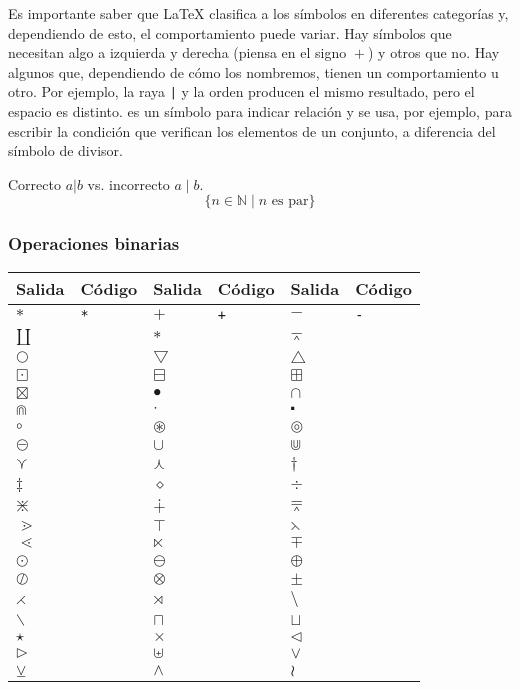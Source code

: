 \documentclass{article}
\numberwithin{equation}{section}
\theoremstyle{plain}
\theoremstyle{definition}
\theoremstyle{remark}
\def\X#1{$#1$ & \texttt{#1}} %
\begin{document}
Es importante saber que \LaTeX{} clasifica a los símbolos en diferentes categorías y, dependiendo de esto, el comportamiento puede variar. Hay símbolos que necesitan algo a izquierda y derecha (piensa en el signo ${}+{}$) y otros que no. Hay algunos que, dependiendo de cómo los nombremos, tienen un comportamiento u otro. Por ejemplo, la raya \texttt{|} y la orden \texttt{\pmid} producen el mismo resultado, pero el espacio es distinto. \texttt{\mid} es un símbolo para indicar relación y se usa, por ejemplo, para escribir la condición que verifican los elementos de un conjunto, a diferencia del símbolo de divisor.
\begin{codigo-arriba}
Correcto $a|b$  vs. incorrecto $a \mid b$.
\[\{ n \in \mathbb{N} \mid \text{$n$ es par} \}\]
\end{codigo-arriba}

\subsubsection{Operaciones binarias}

\begin{table}[H]
\centering
\begin{tabular}{@{}*6l@{}}
\toprule
Salida & Código & Salida & Código & Salida & Código \\
\midrule
\X{*} &
\X{+} &
\X{-} \\
\X{\amalg} &
\X{\ast} &
\X{\barwedge} \\
\X{\bigcirc} &
\X{\bigtriangledown} &
\X{\bigtriangleup} \\
\X{\boxdot} &
\X{\boxminus} &
\X{\boxplus} \\
\X{\boxtimes} &
\X{\bullet} &
\X{\cap} \\
\X{\Cap} &
\X{\cdot} &
\X{\centerdot} \\
\X{\circ} & 
\X{\circledast} &
\X{\circledcirc} \\
\X{\circleddash} &
\X{\cup} &
\X{\Cup} \\
\X{\curlyvee} &
\X{\curlywedge} &
\X{\dagger} \\
\X{\ddagger} &
\X{\diamond} &
\X{\div} \\
\X{\divideontimes} & 
\X{\dotplus} &
\X{\doublebarwedge} \\
\X{\gtrdot} &
\X{\intercal} &
\X{\leftthreetimes} \\
\X{\lessdot} &
\X{\ltimes} &
\X{\mp} \\
\X{\odot} &
\X{\ominus} &
\X{\oplus} \\
\X{\oslash} & 
\X{\otimes} &
\X{\pm} \\
\X{\rightthreetimes} & 
\X{\rtimes} &
\X{\setminus} \\
\X{\smallsetminus} &
\X{\sqcap} &
\X{\sqcup} \\
\X{\star} &
\X{\times} &
\X{\triangleleft} \\
\X{\triangleright} &
\X{\uplus} &
\X{\vee} \\
\X{\veebar} &
\X{\wedge} &
\X{\wr} \\
\bottomrule
\end{tabular}
\end{table}
\end{document}
